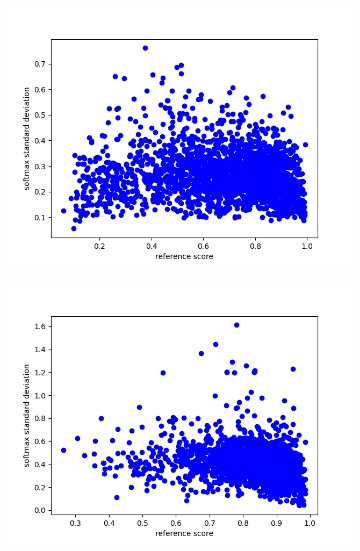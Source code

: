 \begin{figure}[ht]
\begin{subfigure}{0.4\linewidth}
        \includegraphics[width=\textwidth]{Latex/sections/images/seamlessstddiv.png}
    \end{subfigure}
    \begin{subfigure}{0.4\linewidth}
        \includegraphics[width=\textwidth]{Latex/sections/images/dlmstddiv.png}
    \end{subfigure}
    \begin{subfigure}{0.4\linewidth}

\end{subfigure}
\end{figure}
